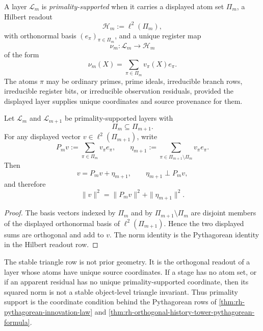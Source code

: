 \begin{definition}
\label{def:rh-primality-supported-layer}
A layer $\mathcal L_m$ is \emph{primality-supported} when it carries a
displayed atom set $\Pi_m$, a Hilbert readout
$$
\mathcal H_m:=\ell^2(\Pi_m),
$$
with orthonormal basis $(e_{\pi})_{\pi\in\Pi_m}$, and a unique register
map
$$
\nu_m:\mathcal L_m\to\mathcal H_m
$$
of the form
$$
\nu_m(X)=\sum_{\pi\in\Pi_m}v_{\pi}(X)e_{\pi}.
$$
The atoms $\pi$ may be ordinary primes, prime ideals, irreducible
branch rows, irreducible register bits, or irreducible observation
residuals, provided the displayed layer supplies unique coordinates and
source provenance for them.
\end{definition}

\begin{theorem}
\label{thm:rh-primality-supported-layers-produce-stable-triangles}
Let $\mathcal L_m$ and $\mathcal L_{m+1}$ be primality-supported layers
with
$$
\Pi_m\subseteq\Pi_{m+1}.
$$
For any displayed vector $v\in\ell^2(\Pi_{m+1})$, write
$$
P_m v:=\sum_{\pi\in\Pi_m}v_{\pi}e_{\pi},
\qquad
\eta_{m+1}:=
\sum_{\pi\in\Pi_{m+1}\setminus\Pi_m}v_{\pi}e_{\pi}.
$$
Then
$$
v=P_m v+\eta_{m+1},
\qquad
\eta_{m+1}\perp P_m v,
$$
and therefore
$$
\|v\|^2
=
\|P_m v\|^2+\|\eta_{m+1}\|^2.
$$
\end{theorem}

\begin{proof}
The basis vectors indexed by $\Pi_m$ and by
$\Pi_{m+1}\setminus\Pi_m$ are disjoint members of the displayed
orthonormal basis of $\ell^2(\Pi_{m+1})$. Hence the two displayed sums
are orthogonal and add to $v$. The norm identity is the Pythagorean
identity in the Hilbert readout row.
\end{proof}

\begin{principle}
\label{prin:rh-primality-coordinate-support-stable-triangles}
The stable triangle row is not prior geometry. It is the orthogonal
readout of a layer whose atoms have unique source coordinates. If a
stage has no atom set, or if an apparent residual has no unique
primality-supported coordinate, then its squared norm is not a stable
object-level triangle invariant. Thus primality support is the
coordinate condition behind the Pythagorean rows of
\autoref{thm:rh-pythagorean-innovation-law} and
\autoref{thm:rh-orthogonal-history-tower-pythagorean-formula}.
\end{principle}

